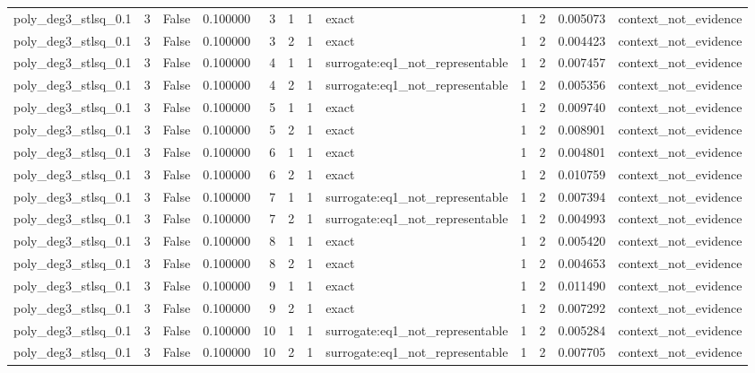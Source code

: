 \begin{tabular}{lrrrrrrlrrrl}
poly\_deg3\_stlsq\_0.1 & 3 & False & 0.100000 & 3 & 1 & 1 & exact & 1 & 2 & 0.005073 & context\_not\_evidence \\
poly\_deg3\_stlsq\_0.1 & 3 & False & 0.100000 & 3 & 2 & 1 & exact & 1 & 2 & 0.004423 & context\_not\_evidence \\
poly\_deg3\_stlsq\_0.1 & 3 & False & 0.100000 & 4 & 1 & 1 & surrogate:eq1\_not\_representable & 1 & 2 & 0.007457 & context\_not\_evidence \\
poly\_deg3\_stlsq\_0.1 & 3 & False & 0.100000 & 4 & 2 & 1 & surrogate:eq1\_not\_representable & 1 & 2 & 0.005356 & context\_not\_evidence \\
poly\_deg3\_stlsq\_0.1 & 3 & False & 0.100000 & 5 & 1 & 1 & exact & 1 & 2 & 0.009740 & context\_not\_evidence \\
poly\_deg3\_stlsq\_0.1 & 3 & False & 0.100000 & 5 & 2 & 1 & exact & 1 & 2 & 0.008901 & context\_not\_evidence \\
poly\_deg3\_stlsq\_0.1 & 3 & False & 0.100000 & 6 & 1 & 1 & exact & 1 & 2 & 0.004801 & context\_not\_evidence \\
poly\_deg3\_stlsq\_0.1 & 3 & False & 0.100000 & 6 & 2 & 1 & exact & 1 & 2 & 0.010759 & context\_not\_evidence \\
poly\_deg3\_stlsq\_0.1 & 3 & False & 0.100000 & 7 & 1 & 1 & surrogate:eq1\_not\_representable & 1 & 2 & 0.007394 & context\_not\_evidence \\
poly\_deg3\_stlsq\_0.1 & 3 & False & 0.100000 & 7 & 2 & 1 & surrogate:eq1\_not\_representable & 1 & 2 & 0.004993 & context\_not\_evidence \\
poly\_deg3\_stlsq\_0.1 & 3 & False & 0.100000 & 8 & 1 & 1 & exact & 1 & 2 & 0.005420 & context\_not\_evidence \\
poly\_deg3\_stlsq\_0.1 & 3 & False & 0.100000 & 8 & 2 & 1 & exact & 1 & 2 & 0.004653 & context\_not\_evidence \\
poly\_deg3\_stlsq\_0.1 & 3 & False & 0.100000 & 9 & 1 & 1 & exact & 1 & 2 & 0.011490 & context\_not\_evidence \\
poly\_deg3\_stlsq\_0.1 & 3 & False & 0.100000 & 9 & 2 & 1 & exact & 1 & 2 & 0.007292 & context\_not\_evidence \\
poly\_deg3\_stlsq\_0.1 & 3 & False & 0.100000 & 10 & 1 & 1 & surrogate:eq1\_not\_representable & 1 & 2 & 0.005284 & context\_not\_evidence \\
poly\_deg3\_stlsq\_0.1 & 3 & False & 0.100000 & 10 & 2 & 1 & surrogate:eq1\_not\_representable & 1 & 2 & 0.007705 & context\_not\_evidence \\

\end{tabular}
